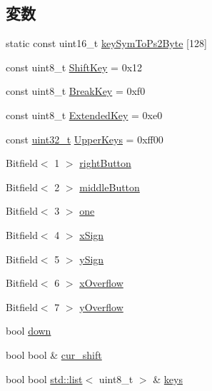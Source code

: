 \subsection*{変数}
\begin{DoxyCompactItemize}
\item 
static const uint16\_\-t \hyperlink{namespacePs2_a23aeb10a3924a5bdb7f4f9e21b03e515}{keySymToPs2Byte} \mbox{[}128\mbox{]}
\item 
const uint8\_\-t \hyperlink{namespacePs2_ab54ac8eb8bfad07e5819e768954d620d}{ShiftKey} = 0x12
\item 
const uint8\_\-t \hyperlink{namespacePs2_a55ae7a700898fcdd9b19b560422197d1}{BreakKey} = 0xf0
\item 
const uint8\_\-t \hyperlink{namespacePs2_a6dc2041a4414c52e454ac11cc1c0d657}{ExtendedKey} = 0xe0
\item 
const \hyperlink{Type_8hh_a435d1572bf3f880d55459d9805097f62}{uint32\_\-t} \hyperlink{namespacePs2_ac80d2dae8a45e683563043abfbb5ab16}{UpperKeys} = 0xff00
\item 
Bitfield$<$ 1 $>$ \hyperlink{namespacePs2_a9f14f6a1f4da750d3ef23cf0a52428c5}{rightButton}
\item 
Bitfield$<$ 2 $>$ \hyperlink{namespacePs2_a55b347b21558f05dcfd7e4817c08bb94}{middleButton}
\item 
Bitfield$<$ 3 $>$ \hyperlink{namespacePs2_a1ad8e11da1d27b0aba8a7bd97199ea49}{one}
\item 
Bitfield$<$ 4 $>$ \hyperlink{namespacePs2_a98870caa9bd24727a03e11ce4743b48d}{xSign}
\item 
Bitfield$<$ 5 $>$ \hyperlink{namespacePs2_a9e5e7f9b5d4b0354b04839a29f554cfe}{ySign}
\item 
Bitfield$<$ 6 $>$ \hyperlink{namespacePs2_af3731450409d7bf437330fba9b0f47ad}{xOverflow}
\item 
Bitfield$<$ 7 $>$ \hyperlink{namespacePs2_a1fe8542266acaa70cb542dd34f7a3efd}{yOverflow}
\item 
bool \hyperlink{namespacePs2_ac30355235d44e8f7b0a538a510bcbbeb}{down}
\item 
bool bool \& \hyperlink{namespacePs2_a7110d60593b39f7b7eba87904e2ae359}{cur\_\-shift}
\item 
bool bool \hyperlink{classstd_1_1list}{std::list}$<$ uint8\_\-t $>$ \& \hyperlink{namespacePs2_a9c0125dcc49548ab16bf4d1b20c4b381}{keys}
\end{DoxyCompactItemize}


